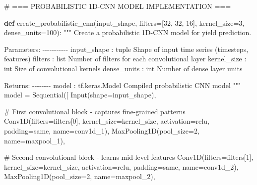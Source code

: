 \documentclass[
  letterpaper,
  DIV=11,
  numbers=noendperiod]{scrreprt}
\newenvironment{Shaded}{\begin{snugshade}}{\end{snugshade}}
\newcommand{\CommentTok}[1]{\textcolor[rgb]{0.37,0.37,0.37}{#1}}
\newcommand{\DecValTok}[1]{\textcolor[rgb]{0.68,0.00,0.00}{#1}}
\newcommand{\KeywordTok}[1]{\textcolor[rgb]{0.00,0.23,0.31}{\textbf{#1}}}
\newcommand{\NormalTok}[1]{\textcolor[rgb]{0.00,0.23,0.31}{#1}}
\newcommand{\OperatorTok}[1]{\textcolor[rgb]{0.37,0.37,0.37}{#1}}
\newcommand{\StringTok}[1]{\textcolor[rgb]{0.13,0.47,0.30}{#1}}
\begin{document}
\begin{Shaded}
\begin{Highlighting}[]

\CommentTok{\# === PROBABILISTIC 1D{-}CNN MODEL IMPLEMENTATION ===}

\KeywordTok{def}\NormalTok{ create\_probabilistic\_cnn(input\_shape, filters}\OperatorTok{=}\NormalTok{[}\DecValTok{32}\NormalTok{, }\DecValTok{32}\NormalTok{, }\DecValTok{16}\NormalTok{], kernel\_size}\OperatorTok{=}\DecValTok{3}\NormalTok{, dense\_units}\OperatorTok{=}\DecValTok{100}\NormalTok{):}
    \CommentTok{"""}
\CommentTok{    Create a probabilistic 1D{-}CNN model for yield prediction.}

\CommentTok{    Parameters:}
\CommentTok{    {-}{-}{-}{-}{-}{-}{-}{-}{-}{-}{-}}
\CommentTok{    input\_shape : tuple}
\CommentTok{        Shape of input time series (timesteps, features)}
\CommentTok{    filters : list}
\CommentTok{        Number of filters for each convolutional layer}
\CommentTok{    kernel\_size : int}
\CommentTok{        Size of convolutional kernels}
\CommentTok{    dense\_units : int}
\CommentTok{        Number of dense layer units}

\CommentTok{    Returns:}
\CommentTok{    {-}{-}{-}{-}{-}{-}{-}{-}}
\CommentTok{    model : tf.keras.Model}
\CommentTok{        Compiled probabilistic CNN model}
\CommentTok{    """}
\NormalTok{    model }\OperatorTok{=}\NormalTok{ Sequential([}
\NormalTok{        Input(shape}\OperatorTok{=}\NormalTok{input\_shape),}

        \CommentTok{\# First convolutional block {-} captures fine{-}grained patterns}
\NormalTok{        Conv1D(filters}\OperatorTok{=}\NormalTok{filters[}\DecValTok{0}\NormalTok{], kernel\_size}\OperatorTok{=}\NormalTok{kernel\_size,}
\NormalTok{               activation}\OperatorTok{=}\StringTok{\textquotesingle{}relu\textquotesingle{}}\NormalTok{, padding}\OperatorTok{=}\StringTok{\textquotesingle{}same\textquotesingle{}}\NormalTok{, name}\OperatorTok{=}\StringTok{\textquotesingle{}conv1d\_1\textquotesingle{}}\NormalTok{),}
\NormalTok{        MaxPooling1D(pool\_size}\OperatorTok{=}\DecValTok{2}\NormalTok{, name}\OperatorTok{=}\StringTok{\textquotesingle{}maxpool\_1\textquotesingle{}}\NormalTok{),}

        \CommentTok{\# Second convolutional block {-} learns mid{-}level features}
\NormalTok{        Conv1D(filters}\OperatorTok{=}\NormalTok{filters[}\DecValTok{1}\NormalTok{], kernel\_size}\OperatorTok{=}\NormalTok{kernel\_size,}
\NormalTok{               activation}\OperatorTok{=}\StringTok{\textquotesingle{}relu\textquotesingle{}}\NormalTok{, padding}\OperatorTok{=}\StringTok{\textquotesingle{}same\textquotesingle{}}\NormalTok{, name}\OperatorTok{=}\StringTok{\textquotesingle{}conv1d\_2\textquotesingle{}}\NormalTok{),}
\NormalTok{        MaxPooling1D(pool\_size}\OperatorTok{=}\DecValTok{2}\NormalTok{, name}\OperatorTok{=}\StringTok{\textquotesingle{}maxpool\_2\textquotesingle{}}\NormalTok{),}


\end{Highlighting}
\end{Shaded}
\end{document}
